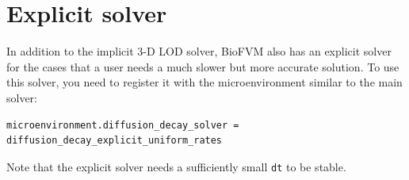 \documentclass[11pt]{article}
\begin{document}
\section{Explicit solver}
\label{explicit_solver}
In addition to the implicit 3-D LOD solver, BioFVM also has an explicit solver for the cases that a user needs a much slower but more accurate solution. To use this solver, you need to register it with the microenvironment similar to the main solver:
\begin{verbatim}
microenvironment.diffusion_decay_solver = diffusion_decay_explicit_uniform_rates
\end{verbatim}

Note that the explicit solver needs a sufficiently small \verb:dt: to be stable.
\end{document}
